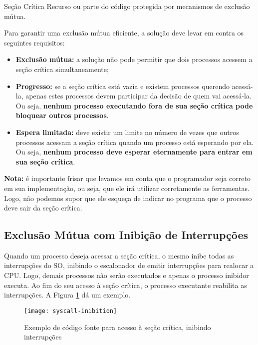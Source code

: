 \begin{definicao}{Seção Crítica}
  Recurso ou parte do código protegida por mecanismos de exclusão mútua.
\end{definicao}

Para garantir uma exclusão mútua eficiente, a solução deve levar em contra os seguintes requisitos:
\begin{itemize}
  \item \textbf{Exclusão mútua:} a solução não pode permitir que dois processos acessem a seção crítica simultaneamente;

  \item \textbf{Progresso:} se a seção crítica está vazia e existem processos querendo acessá-la, apenas estes processos devem participar da decisão de quem vai acessá-la. Ou seja, \textbf{nenhum processo executando fora de sua seção crítica pode bloquear outros processos}.

  \item \textbf{Espera limitada:} deve existir um limite no número de vezes que outros processos acessam a seção crítica quando um processo está esperando por ela. Ou seja, \textbf{nenhum processo deve esperar eternamente para entrar em sua seção crítica}.
\end{itemize}

\textbf{Nota:} é importante frisar que levamos em conta que o programador seja correto em sua implementação, ou seja, que ele irá utilizar corretamente as ferramentas. Logo, não podemos supor que ele esqueça de indicar no programa que o processo deve sair da seção crítica.




\subsection{Exclusão Mútua com Inibição de Interrupções}
Quando um processo deseja acessar a seção crítica, o mesmo inibe todas as interrupções do SO, inibindo o escalonador de emitir interrupções para realocar a CPU. Logo, demais processos não serão executados e apenas o processo inibidor executa. Ao fim do seu acesso à seção crítica, o processo executante reabilita as interrupções. A Figura \ref{fig:syscall-inibition} dá um exemplo.

\begin{figure}[ht]
  \centering
  \texttt{[image: syscall-inibition]}
  \caption{Exemplo de código fonte para acesso à seção crítica, inibindo interrupções}
  \label{fig:syscall-inibition}
\end{figure}

